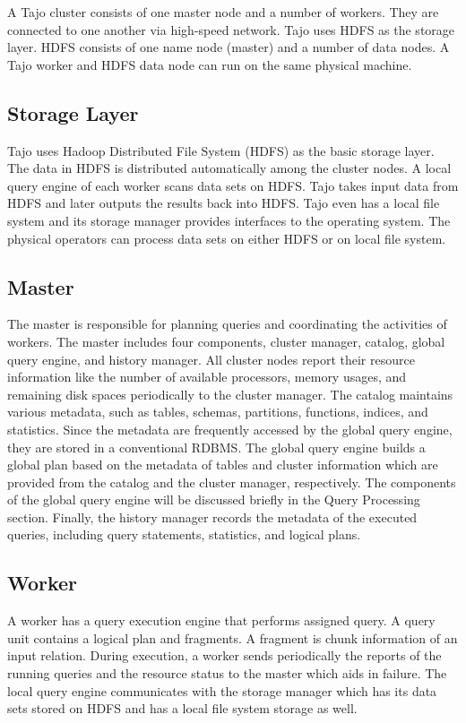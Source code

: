 \documentclass[9pt,twocolumn,twoside]{../../styles/osajnl}
\begin{document}
A Tajo cluster \cite{tajo-paper} consists of one master node and a
number of workers. They are connected to one another via high-speed
network. Tajo uses HDFS as the storage layer. HDFS consists of one
name node (master) and a number of data nodes. A Tajo worker and HDFS
data node can run on the same physical machine.

\subsection{Storage Layer}
Tajo uses Hadoop Distributed File System (HDFS)\cite{tajo-paper} as
the basic storage layer. The data in HDFS is distributed automatically
among the cluster nodes. A local query engine of each worker scans
data sets on HDFS. Tajo takes input data from HDFS and later outputs
the results back into HDFS. Tajo even has a local file system and its
storage manager provides interfaces to the operating system. The
physical operators can process data sets on either HDFS or on local
file system.

\subsection{Master}

 The master\cite{tajo-paper} is responsible for planning queries and
 coordinating the activities of workers. The master includes four
 components, cluster manager, catalog, global query engine, and
 history manager. All cluster nodes report their resource information
 like the number of available processors, memory usages, and remaining
 disk spaces periodically to the cluster manager. The catalog
 maintains various metadata, such as tables, schemas, partitions,
 functions, indices, and statistics. Since the metadata are frequently
 accessed by the global query engine, they are stored in a
 conventional RDBMS. The global query engine builds a global plan
 based on the metadata of tables and cluster information which are
 provided from the catalog and the cluster manager, respectively. The
 components of the global query engine will be discussed briefly in
 the Query Processing section. Finally, the history manager records
 the metadata of the executed queries, including query statements,
 statistics, and logical plans.

\subsection{Worker}

A worker has a query execution engine that performs assigned query. A
query unit contains a logical plan and fragments. A fragment is chunk
information of an input relation. During execution, a worker sends
periodically the reports of the running queries and the resource
status to the master which aids in failure. The local query engine
communicates with the storage manager which has its data sets stored
on HDFS and has a local file system storage as well.
\end{document}
